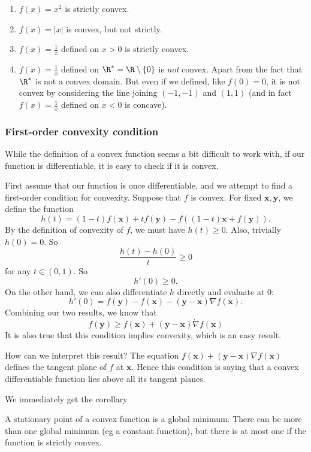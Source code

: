 \documentclass[a4paper]{article}
\begin{document}
\begin{eg}\leavevmode
  \begin{enumerate}
    \item $f(x) = x^2$ is strictly convex.
    \item $f(x) = |x|$ is convex, but not strictly.
    \item $f(x) = \frac{1}{x}$ defined on $x > 0$ is strictly convex.
    \item $f(x) = \frac{1}{x}$ defined on $\R^* = \R \setminus \{0\}$ is \emph{not} convex. Apart from the fact that $\R^*$ is not a convex domain. But even if we defined, like $f(0) = 0$, it is not convex by considering the line joining $(-1, -1)$ and $(1, 1)$ (and in fact $f(x) = \frac{1}{x}$ defined on $x < 0$ is concave).
  \end{enumerate}
\end{eg}
\subsubsection{First-order convexity condition}
While the definition of a convex function seems a bit difficult to work with, if our function is differentiable, it is easy to check if it is convex.

First assume that our function is once differentiable, and we attempt to find a first-order condition for convexity. Suppose that $f$ is convex. For fixed $\mathbf{x}, \mathbf{y}$, we define the function
\[
  h(t) = (1 - t)f(\mathbf{x}) + tf(\mathbf{y}) - f((1 - t)\mathbf{x} + f(\mathbf{y})).
\]
By the definition of convexity of $f$, we must have $h(t) \geq 0$. Also, trivially $h(0) = 0$. So
\[
  \frac{h(t) - h(0)}{t} \geq 0
\]
for any $t\in (0, 1)$. So
\[
  h'(0) \geq 0.
\]
On the other hand, we can also differentiate $h$ directly and evaluate at $0$:
\[
  h'(0) = f(\mathbf{y}) - f(\mathbf{x}) - (\mathbf{y} - \mathbf{x})\nabla f (\mathbf{x}).
\]
Combining our two results, we know that
\[
  f(\mathbf{y}) \geq f(\mathbf{x}) + (\mathbf{y} - \mathbf{x})\dot \nabla f(\mathbf{x}) \tag{$\dagger$}
\]
It is also true that this condition implies convexity, which is an easy result.

How can we interpret this result? The equation $f(\mathbf{x}) + (\mathbf{y} - \mathbf{x})\nabla f(\mathbf{x})$ defines the tangent plane of $f$ at $\mathbf{x}$. Hence this condition is saying that a convex differentiable function lies above all its tangent planes.

We immediately get the corollary
\begin{cor}
  A stationary point of a convex function is a global minimum. There can be more than one global minimum (eg a constant function), but there is at most one if the function is strictly convex.
\end{cor}
\end{document}
